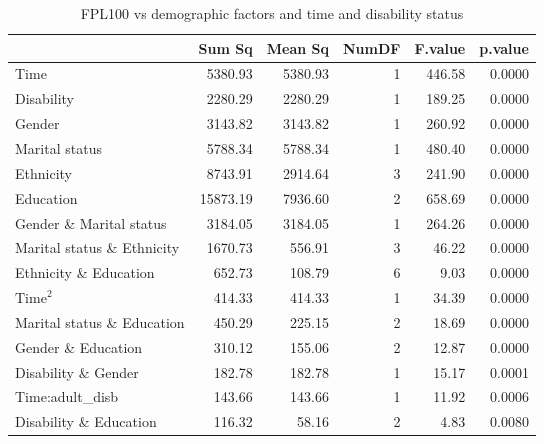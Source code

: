 \begin{table}[H]
\footnotesize
\centering
\begin{tabular}{lrrrrr}
  \hline
  & Sum Sq & Mean Sq & NumDF & F.value & p.value \\ 
  \hline
  Time & 5380.93 & 5380.93 & 1 & 446.58 & 0.0000 \\ 
  Disability & 2280.29 & 2280.29 & 1 & 189.25 & 0.0000 \\ 
  Gender & 3143.82 & 3143.82 & 1 & 260.92 & 0.0000 \\ 
  Marital status & 5788.34 & 5788.34 & 1 & 480.40 & 0.0000 \\ 
  Ethnicity & 8743.91 & 2914.64 & 3 & 241.90 & 0.0000 \\ 
  Education & 15873.19 & 7936.60 & 2 & 658.69 & 0.0000 \\ 
  Gender \& Marital status & 3184.05 & 3184.05 & 1 & 264.26 & 0.0000 \\ 
  Marital status \& Ethnicity & 1670.73 & 556.91 & 3 & 46.22 & 0.0000 \\ 
  Ethnicity \& Education & 652.73 & 108.79 & 6 & 9.03 & 0.0000 \\ 
  $\text{Time}^2$ & 414.33 & 414.33 & 1 & 34.39 & 0.0000 \\ 
  Marital status \& Education & 450.29 & 225.15 & 2 & 18.69 & 0.0000 \\ 
  Gender \& Education & 310.12 & 155.06 & 2 & 12.87 & 0.0000 \\ 
  Disability \& Gender & 182.78 & 182.78 & 1 & 15.17 & 0.0001 \\ 
  Time:adult\_disb & 143.66 & 143.66 & 1 & 11.92 & 0.0006 \\ 
  Disability \& Education & 116.32 & 58.16 & 2 & 4.83 & 0.0080 \\ 
   \hline
\end{tabular}
\caption{FPL100 vs demographic factors and time and disability status} 
\label{tab:Anova1}
\end{table}


